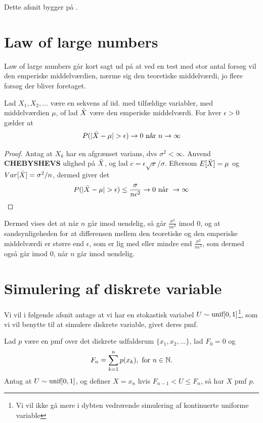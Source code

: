 Dette afsnit bygger på \cite{sandsynlighedsBog}.
\section{Law of large numbers}
Law of large numbers går kort sagt ud på at ved en test med stor antal forsøg vil den emperiske middelværdien, nærme sig den teoretiske middelværdi, jo flere forsøg der bliver foretaget.
\begin{thm}%
    Lad $X_1, X_2, \dots$ være en sekvens af iid. med tilfældige variabler, med middelværdien $\mu$, of lad $\Bar{X}$ være den emperiske middelværdi. For hver $\epsilon>0$ gælder at
    \begin{align*}
        P(|\Bar{X}-\mu|>\epsilon) \rightarrow 0 \text{ når } n \rightarrow \infty
    \end{align*}
\end{thm}
\begin{proof}
    Antag at $X_k$ har en afgrænset varians, dvs $\sigma^2<\infty$. Anvend \textbf{CHEBYSHEVS} ulighed på $\Bar{X}$, og lad $c=\epsilon \sqrt{x}/\sigma$. Eftersom $E[\Bar{X}]=\mu$ og $Var[\Bar{X}]=\sigma^2/n$, dermed giver det
    \begin{align*}
        P(|\Bar{X}-\mu| > \epsilon) \leq \frac{\sigma}{n\epsilon^2} \rightarrow 0 \text{ når } \rightarrow \infty
    \end{align*}
\end{proof}
Dermed vises det at når $n$ går imod uendelig, så går $\frac{\sigma^2}{n\epsilon^2}$ imod $0$, og at sandsynligeheden for at differensen mellem den teoretiske og den emperiske middelværdi er større end $\epsilon$, som er lig med eller mindre end $\frac{\sigma^2}{n\epsilon^2}$, som dermed også går imod 0, når $n$ går imod uendelig.

\section{Simulering af diskrete variable} 
Vi vil i følgende afsnit antage at vi har en stokastisk variabel $U \sim \textnormal{unif}[0,1]$\footnote{Vi vil ikke gå mere i dybten vedrørende simulering af kontinuerte uniforme variable}, som vi vil benytte til at simulere diskrete variable, givet deres pmf.
\begin{thm} \label{thm:simuleringAfDiskreteVaraible}
    Lad $p$ være en pmf over det diskrete udfaldsrum $\{x_1, x_2, \ldots\}$, lad $F_0 = 0$ og
    \begin{equation*}
        F_n = \sum^n_{k = 1} p(x_k), \text{ for } n \in \mathbb{N}.
    \end{equation*}
    Antag at $U \sim \textnormal{unif}[0, 1]$, og definer $X = x_n$ hvis $F_{n - 1} < U \leq F_n$, så har $X$ pmf $p$.
\end{thm}

